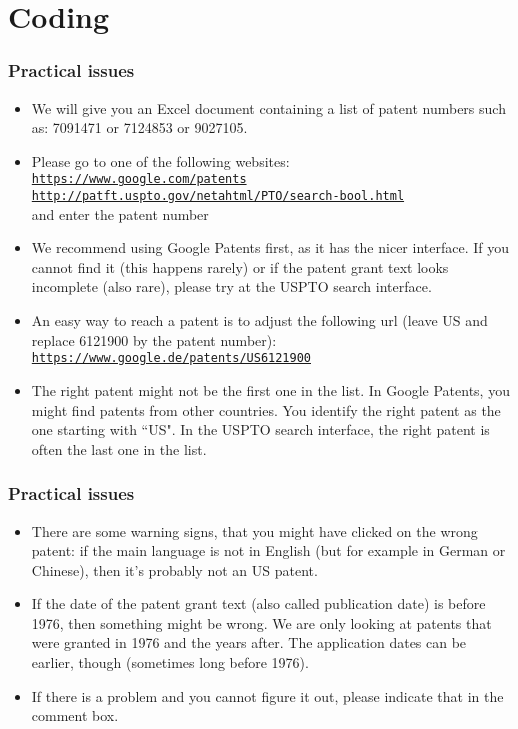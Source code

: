 \documentclass[10pt]{beamer}
\begin{document}
\section{Coding}
\setcounter{subsection}{1} %

\begin{frame}\frametitle{Practical issues}
	\begin{itemize}	
	\item We will give you an Excel document containing a list of patent numbers such as: 7091471 or 7124853 or 9027105.
	\item Please go to one of the following websites: \\[0.1cm]
 \href{https://www.google.com/patents}{\texttt{\textcolor{myred}{https://www.google.com/patents}}}\\[0.1cm]
\href{http://patft.uspto.gov/netahtml/PTO/search-bool.html}{\texttt{\textcolor{myred}{http://patft.uspto.gov/netahtml/PTO/search-bool.html}}}\\[0.1cm]
	and enter the patent number
	\item We recommend using Google Patents first, as it has the nicer interface. If you cannot find it (this happens rarely) or if the patent grant text looks incomplete (also rare), please try at the USPTO search interface. 
	\item An easy way to reach a patent is to adjust the following url (leave US and replace 6121900 by the patent number):\\[0.1cm]
 \href{https://www.google.de/patents/US6121900}{\texttt{\textcolor{myred}{https://www.google.de/patents/US6121900}}}\\[0.1cm]
	\item The right patent might not be the first one in the list. In Google Patents, you might find patents from other countries. You identify the right patent as the one starting with ``US". In the USPTO search interface, the right patent is often the last one in the list.
	\end{itemize}
\end{frame}

\begin{frame}\frametitle{Practical issues}
	\begin{itemize}	
	\item There are some warning signs, that you might have clicked on the wrong patent: if the main language is not in English (but for example in German or Chinese), then it's probably not an US patent.
	\item If the date of the patent grant text (also called publication date) is before 1976, then something might be wrong. We are only looking at patents that were granted in 1976 and the years after. The application dates can be earlier, though (sometimes long before 1976). 
	\item If there is a problem and you cannot figure it out, please indicate that in the comment box.
	\end{itemize}
\end{frame}
\end{document}
